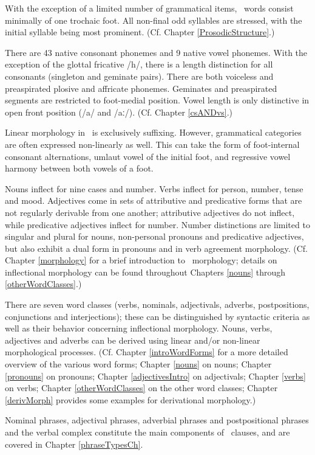 With the exception of a limited number of grammatical items, \PS\ words consist minimally of one trochaic foot. All non-final odd syllables are stressed, with the initial syllable being most prominent. (Cf. Chapter \ref{ProsodicStructure}.) 

There are 43 native consonant phonemes and 9 native vowel phonemes. With the exception of the glottal fricative /h/, there is a length distinction for all consonants (singleton and geminate pairs). There are both voiceless and preaspirated plosive and affricate phonemes. Geminates and preaspirated segments are restricted to foot-medial position. Vowel length is only distinctive in open front position (/a/ and /aː/). (Cf. Chapter \ref{csANDvs}.) 


Linear morphology in \PS\ is exclusively suffixing. However, grammatical categories are often expressed non-linearly as well. This can take the form of foot-internal consonant alternations, umlaut vowel of the initial foot, and regressive vowel harmony between both vowels of a foot. 

Nouns inflect for nine cases and number. Verbs inflect for person, number, tense and mood. Adjectives come in sets of attributive and predicative forms that are not regularly derivable from one another; attributive adjectives do not inflect, while predicative adjectives inflect for number. Number distinctions are limited to singular and plural for nouns, non-personal pronouns and predicative adjectives, but also exhibit a dual form in pronouns and in verb agreement morphology. (Cf. Chapter \ref{morphology} for a brief introduction to \PS\ morphology; details on inflectional morphology can be found throughout Chapters \ref{nouns} through \ref{otherWordClasses}.) 

There are seven word classes (verbs, nominals, adjectivals, adverbs, postpositions, conjunctions and interjections); these can be distinguished by syntactic criteria as well as their behavior concerning inflectional morphology. Nouns, verbs, adjectives and adverbs can be derived using linear and/or non-linear morphological processes. (Cf. Chapter \ref{introWordForms} for a more detailed overview of the various word forms; Chapter \ref{nouns} on nouns; Chapter \ref{pronouns} on pronouns; Chapter \ref{adjectivesIntro} on adjectivals; Chapter \ref{verbs} on verbs; Chapter \ref{otherWordClasses} on the other word classes; Chapter \ref{derivMorph} provides some examples for derivational morphology.) 

Nominal phrases, adjectival phrases, adverbial phrases and postpositional phra\-ses and the verbal complex constitute the main components of \PS\ clauses, and are covered in Chapter \ref{phraseTypesCh}. 

